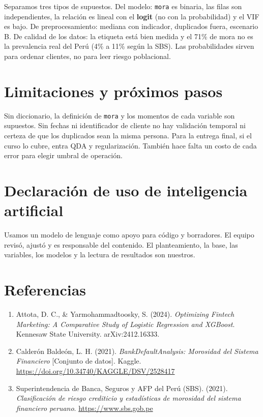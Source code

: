 \documentclass[11pt]{article}
\begin{document}
Separamos tres tipos de supuestos. Del modelo: \texttt{mora} es binaria, las filas son independientes, la relación es lineal con el \textbf{logit} (no con la probabilidad) y el VIF es bajo. De preprocesamiento: mediana con indicador, duplicados fuera, escenario B. De calidad de los datos: la etiqueta está bien medida y el 71\% de mora no es la prevalencia real del Perú (4\% a 11\% según la SBS). Las probabilidades sirven para ordenar clientes, no para leer riesgo poblacional.

\section{Limitaciones y próximos pasos}

Sin diccionario, la definición de \texttt{mora} y los momentos de cada variable son supuestos. Sin fechas ni identificador de cliente no hay validación temporal ni certeza de que los duplicados sean la misma persona. Para la entrega final, si el curso lo cubre, entra QDA y regularización. También hace falta un costo de cada error para elegir umbral de operación.

\section*{Declaración de uso de inteligencia artificial}

Usamos un modelo de lenguaje como apoyo para código y borradores. El equipo revisó, ajustó y es responsable del contenido. El planteamiento, la base, las variables, los modelos y la lectura de resultados son nuestros.

\section*{Referencias}

\begin{enumerate}[leftmargin=1.6em]
\item Attota, D. C., \& Yarmohammadtoosky, S. (2024). \textit{Optimizing Fintech Marketing: A Comparative Study of Logistic Regression and XGBoost}. Kennesaw State University. arXiv:2412.16333.
\item Calderón Baldeón, L. H. (2021). \textit{BankDefaultAnalysis: Morosidad del Sistema Financiero} [Conjunto de datos]. Kaggle. \url{https://doi.org/10.34740/KAGGLE/DSV/2528417}
\item Superintendencia de Banca, Seguros y AFP del Perú (SBS). (2021). \textit{Clasificación de riesgo crediticio y estadísticas de morosidad del sistema financiero peruano}. \url{https://www.sbs.gob.pe}
\end{enumerate}
\end{document}
